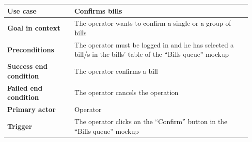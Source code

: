{{{			\begin{table}[h]
			\begin{tabular}{|p{4cm}|p{10cm}|}
			\hline
				\centering \vspace{1mm} \bfseries{Use case} \vspace{1mm} & 
				\vspace{1mm} Confirms bills\vspace{1mm}\\
			\hline
				\centering \vspace{1mm} \bfseries{Goal in context} \vspace{1mm} & 
				\vspace{1mm} The operator wants to confirm a single or a group of bills  \vspace{1mm}\\
			\hline
				\centering \vspace{1mm} \bfseries{Preconditions} \vspace{1mm} & 
				\vspace{1mm} The operator must be logged in and he has selected a bill/s in the bills’ table of the “Bills queue” mockup\vspace{1mm}\\
			\hline
				\centering \vspace{1mm} \bfseries{Success end condition} \vspace{1mm} & 
				\vspace{1mm} The operator confirms a bill\vspace{1mm}\\
			\hline
				\centering \vspace{1mm} \bfseries{Failed end condition} \vspace{1mm} & 
				\vspace{1mm} The operator cancels the operation\vspace{1mm}\\
			\hline
				\centering \vspace{1mm} \bfseries{Primary actor} \vspace{1mm} & 
				\vspace{1mm} Operator \vspace{1mm}\\
			\hline
				\centering \vspace{1mm} \bfseries{Trigger} \vspace{1mm} & 
				\vspace{1mm} The operator clicks on the “Confirm” button in the “Bills queue” mockup\vspace{1mm}\\
			\hline
			\end{tabular}
			\end{table}

}}}
